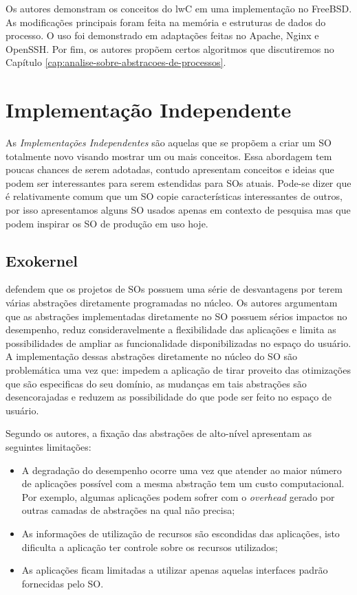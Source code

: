 Os autores demonstram os conceitos do lwC em uma implementação no FreeBSD. As
modificações principais foram feita na memória e estruturas de dados do
processo. O uso foi demonstrado em adaptações feitas no Apache, Nginx e
OpenSSH. Por fim, os autores propõem certos algoritmos que discutiremos no
Capítulo \ref{cap:analise-sobre-abstracoes-de-processos}.

\section{Implementação Independente}

As \textit{Implementações Independentes} são aquelas que se propõem a criar um
SO totalmente novo visando mostrar um ou mais conceitos. Essa abordagem tem
poucas chances de serem adotadas, contudo apresentam conceitos e ideias que
podem ser interessantes para serem estendidas para SOs atuais. Pode-se dizer
que é relativamente comum que um SO copie características interessantes de
outros, por isso apresentamos alguns SO usados apenas em contexto de pesquisa
mas que podem inspirar os SO de produção em uso hoje.

\subsection{Exokernel}

\cite{exokernel} defendem que os projetos de SOs possuem uma série de
desvantagens por terem várias abstrações diretamente programadas no núcleo. Os
autores argumentam que as abstrações implementadas diretamente no SO possuem
sérios impactos no desempenho, reduz consideravelmente a flexibilidade das
aplicações e limita as possibilidades de ampliar as funcionalidade
disponibilizadas no espaço do usuário. A implementação dessas abstrações
diretamente no núcleo do SO são problemática uma vez que: impedem a aplicação
de tirar proveito das otimizações que são especificas do seu domínio, as
mudanças em tais abstrações são desencorajadas e reduzem as possibilidade do
que pode ser feito no espaço de usuário.

Segundo os autores, a fixação das abstrações de alto-nível apresentam as
seguintes limitações:

\begin{itemize}
  \item A degradação do desempenho ocorre uma vez que atender ao maior número
        de aplicações possível com a mesma abstração tem um custo
        computacional. Por exemplo, algumas aplicações podem sofrer com o
        \emph{overhead} gerado por outras camadas de abstrações na qual não
        precisa;
  \item As informações de utilização de recursos são escondidas das aplicações,
        isto dificulta a aplicação ter controle sobre os recursos utilizados;
  \item As aplicações ficam limitadas a utilizar apenas aquelas interfaces
        padrão fornecidas pelo SO.
\end{itemize}

